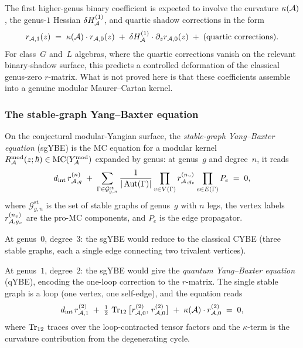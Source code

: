 \begin{remark}
\label{rem:thqg-V-genus-one-correction}
The first higher-genus binary coefficient is expected to involve the
curvature $\kappa(\mathcal{A})$, the genus-$1$ Hessian
$\delta H^{(1)}_{\mathcal{A}}$, and quartic shadow corrections in the form
\begin{equation}\label{eq:thqg-V-genus-one-r}
r_{\mathcal{A},1}(z)
\;=\;
\kappa(\mathcal{A}) \cdot r_{\mathcal{A},0}(z)
\;+\;
\delta H^{(1)}_{\mathcal{A}} \cdot \partial_z r_{\mathcal{A},0}(z)
\;+\;
(\text{quartic corrections}).
\end{equation}
For class~$G$ and~$L$ algebras, where the quartic corrections vanish
on the relevant binary-shadow surface, this predicts a controlled
deformation of the classical genus-zero $r$-matrix. What is not
proved here is that these coefficients assemble into a genuine
modular Maurer--Cartan kernel.
\end{remark}


\subsubsection{The stable-graph Yang--Baxter equation}

\begin{definition}
\label{def:thqg-V-stable-graph-ybe}
On the conjectural modular-Yangian surface, the
\emph{stable-graph Yang--Baxter equation} (sgYBE) is the MC
equation for a modular kernel
$R^{\mathrm{mod}}_{\mathcal{A}}(z;\hbar)\in\mathrm{MC}(Y^{\mathrm{mod}}_{\mathcal{A}})$ expanded by genus:
at genus~$g$ and degree~$n$, it reads
\begin{equation}\label{eq:thqg-V-sgybe-expanded}
d_{\mathrm{int}}\,r_{\mathcal{A},g}^{(n)}
\;+\;
\sum_{\Gamma \in \mathcal{G}^{\mathrm{st}}_{g,n}}
\frac{1}{|\operatorname{Aut}(\Gamma)|}
\prod_{v \in V(\Gamma)} r_{\mathcal{A},g_v}^{(n_v)}
\prod_{e \in E(\Gamma)} P_e
\;=\; 0,
\end{equation}
where $\mathcal{G}^{\mathrm{st}}_{g,n}$ is the set of stable
graphs of genus~$g$ with $n$ legs, the vertex labels $r_{\mathcal{A},g_v}^{(n_v)}$
are the pro-MC components, and $P_e$ is the edge propagator.

At genus~$0$, degree~$3$: the sgYBE would reduce to the classical
CYBE (three stable graphs, each a single edge connecting two
trivalent vertices).

At genus~$1$, degree~$2$: the sgYBE would give the
\emph{quantum Yang--Baxter equation} (qYBE), encoding the
one-loop correction to the $r$-matrix. The single stable graph
is a loop (one vertex, one self-edge), and the equation reads
\begin{equation}\label{eq:thqg-V-qybe}
d_{\mathrm{int}}\,r_{\mathcal{A},1}^{(2)}
\;+\;
\tfrac{1}{2}\,\operatorname{Tr}_{12}\,
\bigl[r_{\mathcal{A},0}^{(2)},\,r_{\mathcal{A},0}^{(2)}\bigr]
\;+\;
\kappa(\mathcal{A}) \cdot r_{\mathcal{A},0}^{(2)}
\;=\; 0,
\end{equation}
where $\operatorname{Tr}_{12}$ traces over the loop-contracted tensor factors and
the $\kappa$-term is the curvature contribution from the degenerating
cycle.
\end{definition}

